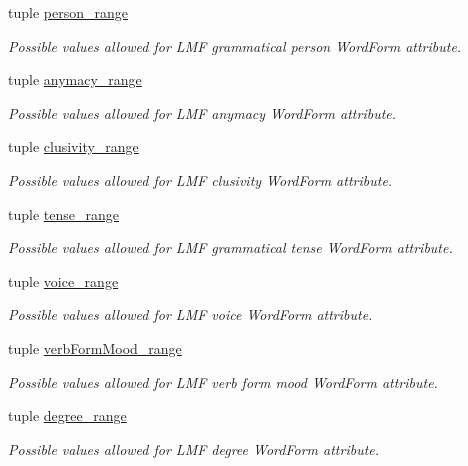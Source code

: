 \begin{DoxyCompactItemize}
tuple \hyperlink{namespacelmf_1_1src_1_1common_1_1range_ad711c6c7c0e62384f61b106ec7bf2af0}{person\+\_\+range}
\begin{DoxyCompactList}\small\item\em Possible values allowed for L\+M\+F grammatical person Word\+Form attribute. \end{DoxyCompactList}\item 
tuple \hyperlink{namespacelmf_1_1src_1_1common_1_1range_a28fddc4c01c49d3a0a5d2446ad9f6edd}{anymacy\+\_\+range}
\begin{DoxyCompactList}\small\item\em Possible values allowed for L\+M\+F anymacy Word\+Form attribute. \end{DoxyCompactList}\item 
tuple \hyperlink{namespacelmf_1_1src_1_1common_1_1range_aa39563f49d7d421ce4b55d2385f3a7f7}{clusivity\+\_\+range}
\begin{DoxyCompactList}\small\item\em Possible values allowed for L\+M\+F clusivity Word\+Form attribute. \end{DoxyCompactList}\item 
tuple \hyperlink{namespacelmf_1_1src_1_1common_1_1range_acc04186fd80669c626821ad13dcb1196}{tense\+\_\+range}
\begin{DoxyCompactList}\small\item\em Possible values allowed for L\+M\+F grammatical tense Word\+Form attribute. \end{DoxyCompactList}\item 
tuple \hyperlink{namespacelmf_1_1src_1_1common_1_1range_a23fdc4c034bc34cab81c6b9c051074dd}{voice\+\_\+range}
\begin{DoxyCompactList}\small\item\em Possible values allowed for L\+M\+F voice Word\+Form attribute. \end{DoxyCompactList}\item 
tuple \hyperlink{namespacelmf_1_1src_1_1common_1_1range_a5a57dc7ed7fa1f785e812cfe2c306ef6}{verb\+Form\+Mood\+\_\+range}
\begin{DoxyCompactList}\small\item\em Possible values allowed for L\+M\+F verb form mood Word\+Form attribute. \end{DoxyCompactList}\item 
tuple \hyperlink{namespacelmf_1_1src_1_1common_1_1range_a38a6c009293e81b8b03b7072692f7a3c}{degree\+\_\+range}
\begin{DoxyCompactList}\small\item\em Possible values allowed for L\+M\+F degree Word\+Form attribute. \end{DoxyCompactList}\item 

\end{DoxyCompactItemize}
